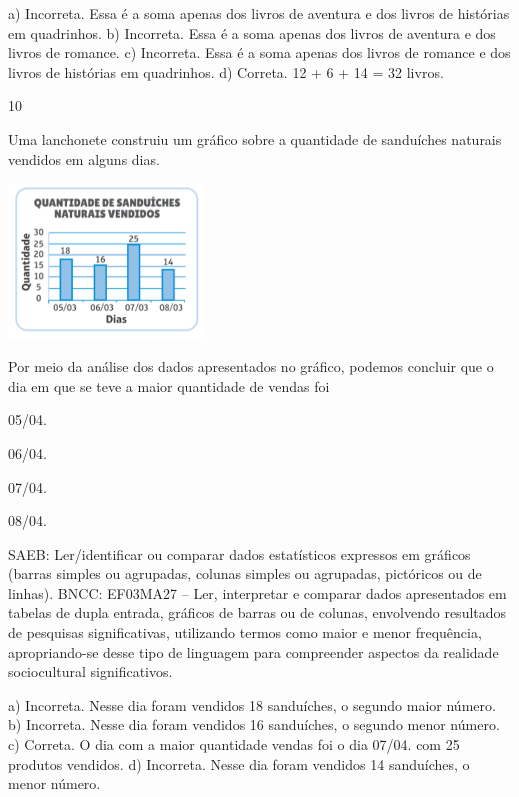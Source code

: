 \begin{multicols}{2}
{\begin{escolha}
{a) Incorreta. Essa é a soma apenas dos livros de aventura e dos livros de histórias em quadrinhos.
b) Incorreta. Essa é a soma apenas dos livros de aventura e dos livros de romance.
c) Incorreta. Essa é a soma apenas dos livros de romance e dos livros de histórias em quadrinhos.
d) Correta. 12 + 6 + 14 = 32 livros.

\num{10}

Uma lanchonete construiu um gráfico sobre a quantidade de sanduíches
naturais vendidos em alguns dias.

\includegraphics[width=2.05128in,height=1.61850in]{media/image124.png}


Por meio da análise dos dados apresentados no gráfico, podemos concluir que o dia em que se teve a maior quantidade de vendas foi

\begin{escolha}

\item
  05/04.
\item
  06/04.
\item
  07/04.
\item
  08/04.
\end{escolha}

SAEB: Ler/identificar ou comparar dados estatísticos
expressos em gráficos (barras simples ou agrupadas, colunas simples ou
agrupadas, pictóricos ou de linhas).
BNCC: EF03MA27 -- Ler, interpretar e comparar dados apresentados em tabelas de dupla entrada,
gráficos de barras ou de colunas, envolvendo resultados de pesquisas significativas, utilizando
termos como maior e menor frequência, apropriando-se desse tipo de linguagem para
compreender aspectos da realidade sociocultural significativos.

a) Incorreta. Nesse dia foram vendidos 18 sanduíches, o segundo maior número.
b) Incorreta. Nesse dia foram vendidos 16 sanduíches, o segundo menor número.
c) Correta. O dia com a maior quantidade vendas foi o dia 07/04. com 25 produtos vendidos.
d) Incorreta. Nesse dia foram vendidos 14 sanduíches, o menor número.

}
\end{escolha}}
\end{multicols}
